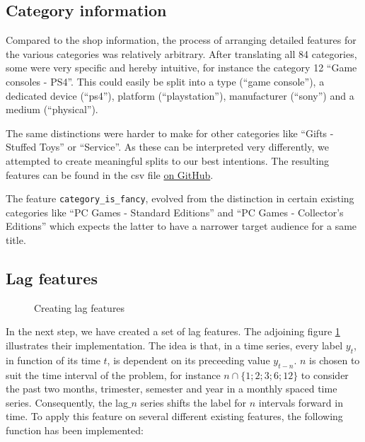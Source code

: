 \subsection{Category information}

Compared to the shop information, the process of arranging detailed features for the various categories was relatively arbitrary. After translating all 84 categories, some were very specific and hereby intuitive, for instance the category 12 \enquote{Game consoles - PS4}. This could easily be split into a type (\enquote{game console}), a dedicated device (\enquote{ps4}), platform (\enquote{playstation}), manufacturer (\enquote{sony}) and a medium (\enquote{physical}).

The same distinctions were harder to make for other categories like \enquote{Gifts - Stuffed Toys} or \enquote{Service}. As these can be interpreted very differently, we attempted to create meaningful splits to our best intentions. The resulting features can be found in the \acrshort{csv} file \href{\repoblobbaseurl\finalCommit/data/feature_engineering/cities.csv}{on GitHub}.

The feature \texttt{category\_is\_fancy}, evolved from the distinction in certain existing categories like \enquote{PC Games - Standard Editions} and \enquote{PC Games - Collector's Editions} which expects the latter to have a narrower target audience for a same title.

\subsection{Lag features}

\begin{wrapfigure}[8]{l}{0.48\textwidth}
\centering

\captionsetup{justification=centering}
\caption{Creating lag features}
\label{lag}
\end{wrapfigure}


In the next step, we have created a set of lag features. The adjoining figure \ref{lag} illustrates their implementation. 
The idea is that, in a time series, every label $y_t$, in function of its time $t$, is dependent on its preceeding value $y_{t-n}$.
$n$ is chosen to suit the time interval of the problem, for instance $n \cap \{1;2;3;6;12\}$ to consider the past two months, trimester, semester and year in a monthly spaced time series. Consequently, the lag$\_n$ series shifts the label for $n$ intervals forward in time. To apply this feature on several different existing features, the following function has been implemented:

